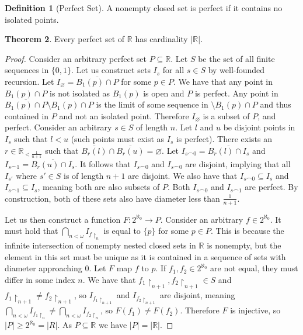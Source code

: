 \documentclass{article}
\theoremstyle{definition}
\newtheorem{thm}{Theorem}[section]
\newtheorem{defn}[thm]{Definition}
\newcommand{\R}{\mathbb{R}}
\newcommand*{\mtset}{\ensuremath{\varnothing}}
\newcommand{\abs}[1]{\lvert#1\rvert}
\begin{document}
\newpage

\begin{defn}[Perfect Set]
    A nonempty closed set is perfect if it contains no isolated points.
\end{defn}

\begin{thm}
    Every perfect set of $\R$ has cardinality $\abs{\R}$.
\end{thm}

\begin{proof}
    Consider an arbitrary perfect set $P \subseteq \R$. Let $S$ be the set of all finite sequences in $\{0, 1\}$. Let us construct sets $I_s$ for all $s \in S$ by well-founded recursion. Let $I_\mtset = \overline{B_1(p) \cap P}$ for some $p \in P$. We have that any point in $B_1(p) \cap P$ is not isolated as $B_1(p)$ is open and $P$ is perfect. Any point in $\overline{B_1(p) \cap P}  \setminus B_1(p) \cap P$ is the limit of some sequence in $\setminus B_1(p) \cap P$ and thus contained in $P$ and not an isolated point. Therefore $I_\mtset$ is a subset of $P$, and perfect. Consider an arbitrary $s \in S$ of length $n$. Let $l$ and $u$ be disjoint points in $I_s$ such that $l < u$ (such points must exist as $I_s$ is perfect). There exists an $r \in \R_{< \frac{1}{n + 1}}$ such that $\overline{B_r(l)}  \cap \overline{B_r(u)} = \mtset$. Let $I_{s \frown 0} = \overline{B_r(l) \cap I_s}$ and $I_{s \frown 1} = \overline{B_r(u) \cap I_s}$. It follows that $I_{s \frown 0}$ and $I_{s \frown 0}$ are disjoint, implying that all $I_{s'}$ where $s' \in S$ is of length $n + 1$ are disjoint. We also have that $I_{s \frown 0} \subseteq I_s$ and $I_{s \frown 1} \subseteq I_{s}$, meaning both are also subsets of $P$. Both $I_{s \frown 0}$ and $I_{s \frown 1}$ are perfect. By construction, both of these sets also have diameter less than $\frac{1}{n + 1}$.

    Let us then construct a function $F: 2^{\aleph_0} \to P$. Consider an arbitrary $f \in 2^{\aleph_0}$. It must hold that $\bigcap_{n < \omega} I_{f\restriction_{n}}$ is equal to $\{p\}$ for some $p \in P$. This is because the infinite intersection of nonempty nested closed sets in $\R$ is nonempty, but the element in this set must be unique as it is contained in a sequence of sets with diameter approaching $0$. Let $F$ map $f$ to $p$. If $f_1, f_2 \in 2^{\aleph_0}$ are not equal, they must differ in some index $n$. We have that $f_1\restriction_{n + 1}, f_2\restriction_{n + 1} \in S$ and $f_1\restriction_{n + 1} \ne f_2\restriction_{n + 1}$, so $I_{f_1\restriction_{n + 1}}$ and $I_{f_2\restriction_{n + 1}}$ are disjoint, meaning $\bigcap_{n < \omega} I_{f_1\restriction_{n}} \ne \bigcap_{n < \omega} I_{f_2\restriction_{n}}$, so $F(f_1) \ne F(f_2)$. Therefore $F$ is injective, so $\abs{P} \ge 2^{\aleph_0} = \abs{R}$. As $P \subseteq \R$ we have $\abs{P} = \abs{\R}$.
\end{proof}
\end{document}
